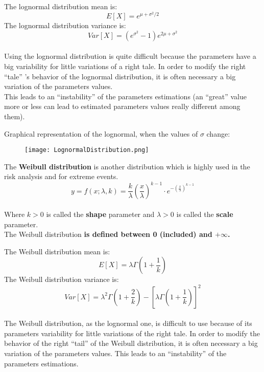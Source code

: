 \begin{frame}
  The lognormal distribution mean is:
  $$ E[X] = e^{\mu + \sigma^2/2} $$
  The lognormal distribution variance is:
  $$ Var[X] = (e^{\sigma^2} - 1) e^{2 \mu + \sigma^2}$$\\
  Using the lognormal distribution is quite difficult because the parameters have a big variability for little variations of a right tale. In order to modify the right ``tale'' 's behavior of the lognormal distribution, it is often necessary a big variation of the parameters values.\\
  This leads to an ``instability'' of the parameters estimations (an ``great'' value more or less can lead to estimated parameters values really different among them).
\end{frame}

\begin{frame}
  \vspace*{.5cm}
  \centering
  Graphical representation of the lognormal, when the values of $ \sigma $ change: \\
  \begin{figure}
    \texttt{[image: LognormalDistribution.png]}
  \end{figure}
\end{frame}


\begin{frame}
  \vspace*{.5cm}
  The \textbf{Weibull distribution} is another distribution which is highly used in the risk analysis and for extreme events.\\
  \vspace*{.5cm}
  $$ y = f(x; \lambda, k) = \frac{k}{\lambda}\left( \frac{x}{\lambda}\right)^{k-1} \cdot e^{-\left(\frac{x}{\lambda} \right)^{k-1}} $$ \\
  \vspace*{.75cm}
  Where $ k > 0 $ is called the \textbf{shape} parameter and $ \lambda > 0 $ is called the \textbf{scale} parameter. \\
  \vspace*{.75cm}
  The Weibull distribution \textbf{is defined between 0 (included) and {\boldmath $ +\infty $}.} \\
\end{frame}

\begin{frame}
  The Weibull distribution mean is:
  $$ E[X] = \lambda \Gamma \left( 1 + \frac{1}{k} \right) $$
  The Weibull distribution variance is:
  $$ Var[X] = \lambda^2 \Gamma \left( 1 + \frac{2}{k} \right) - \left[ \lambda \Gamma \left( 1 + \frac{1}{k} \right) \right]^2 $$ \\
  The Weibull distribution, as the lognormal one, is difficult to use because of its parameters variability for little variations of the right tale. In order to modify the behavior of the right ``tail'' of the Weibull distribution, it is often necessary a big variation of the parameters values. This leads to an ``instability'' of the parameters estimations.
\end{frame}

